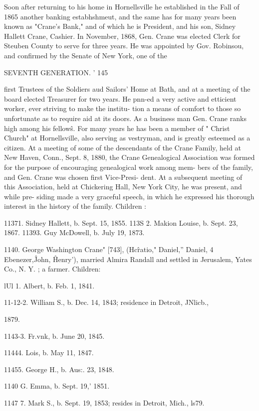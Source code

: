 \documentclass{book}
\begin{document}
Soon after returning to his home in Hornellsville he established 
in the Fall of 1865 another banking estabhshmeut, and the same 
has for many years been known as "Crane's Bank," and of 
which he is President, and his son, Sidney Hallett Crane, Cashier. 
In November, 1868, Gen. Crane was elected Clerk for Steuben 
County to serve for three years. He was appointed by Gov. 
Robinsou, and confirmed by the Senate of New York, one of the 



SEVENTH GENERATION. ' 145 

first Trustees of the Soldiers aud Sailors' Home at Bath, and at a 
meeting of the board elected Treasurer for two years. He pnn-ed 
a very active and etticient worker, ever striving to make the institu- 
tion a means of comfort to those so unfortunate as to require aid 
at its doors. As a business man Gen. Crane ranks high among 
his fellow\^s. For many years he has been a member of " Christ 
Church" at Hornellsville, also serving as vestryman, and is 
greatly esteemed as a citizen. At a meeting of some of the 
descendants of the Crane Family, held at New Haven, Conn., 
Sept. 8, 1880, the Crane Genealogical Association was formed 
for the purpose of encouraging genealogical work among mem- 
bers of the family, and Gen. Crane was chosen first Vice-Presi- 
dent. At a subsequent meeting of this Association, held at 
Chickering Hall, New York City, he was present, and while pre- 
siding made a very graceful speech, in which he expressed his 
thorough interest in the history of the family. Children : 

11371. Sidney Hallett, b. Sept. 15, 1855. 
113S 2. Makion Louise, b. Sept. 23, 1867. 
11393. Guy McDowell, b. July 19, 1873. 

1140. George Washington Crane" [743], (Hc\^ratio," Daniel,'' 
Daniel, 4 Ebenezer,\^ John, \^ Henry'), married Almira Randall and 
settled in Jerusalem, Yates Co., N. Y. ; a farmer. Children: 

lUl 1. Albert, b. Feb. 1, 1841. 

11-12-2. William S., b. Dec. 14, 1843; residence in Detroit, JNlicb., 

1879. 

1143-3. Fr.vnk, b. June 20, 1845. 

11444. Lois, b. May 11, 1847. 

11455. George H., b. Aus:. 23, 1848. 

1140 G. Emma, b. Sept. 19,' 1851. 

1147  7. Mark S., b. Sept. 19, 1853; resides in Detroit, Mich., ls79. 
\end{document}
